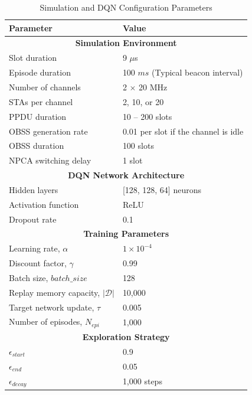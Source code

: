 \documentclass[conference]{IEEEtran}
\begin{document}
\begin{table}[htbp]
\caption{Simulation and DQN Configuration Parameters}
\begin{center}
\begin{tabular}{|l|l|}
\hline
\textbf{Parameter} & \textbf{Value} \\
\hline
\multicolumn{2}{|c|}{\textbf{Simulation Environment}} \\
\hline
Slot duration & 9 $\mu$s \\
Episode duration & 100 $ms$ (Typical beacon interval) \\
Number of channels & 2 $\times$ 20 MHz \\
STAs per channel & 2, 10, or 20 \\
PPDU duration & 10 -- 200 slots \\
OBSS generation rate & 0.01 per slot if the channel is idle \\
OBSS duration & 100 slots \\
NPCA switching delay & 1 slot \\
\hline
\multicolumn{2}{|c|}{\textbf{DQN Network Architecture}} \\
\hline
Hidden layers & [128, 128, 64] neurons \\
Activation function & ReLU \\
Dropout rate & 0.1 \\
\hline
\multicolumn{2}{|c|}{\textbf{Training Parameters}} \\
\hline
Learning rate, $\alpha$ & $1 \times 10^{-4}$ \\
Discount factor, $\gamma$ & 0.99 \\
Batch size, $batch\_size$ & 128 \\
Replay memory capacity, $|\mathcal{D}|$ & 10,000 \\
Target network update, $\tau$ & 0.005 \\
Number of episodes, $N_{epi}$ & 1,000 \\
\hline
\multicolumn{2}{|c|}{\textbf{Exploration Strategy}} \\
\hline
$\epsilon_{start}$ & 0.9 \\
$\epsilon_{end}$ & 0.05 \\
$\epsilon_{decay}$ & 1,000 steps \\
\hline
\end{tabular}
\label{tab:simulation_params}
\end{center}
\end{table}
\end{document}
